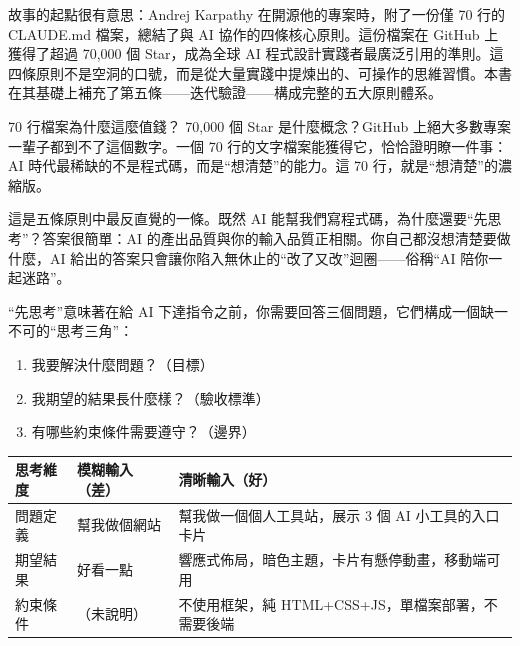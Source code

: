 

故事的起點很有意思：Andrej Karpathy 在開源他的專案時，附了一份僅 70 行的 CLAUDE.md 檔案，總結了與 AI 協作的四條核心原則。這份檔案在 GitHub 上獲得了超過 70,000 個 Star，成為全球 AI 程式設計實踐者最廣泛引用的準則。這四條原則不是空洞的口號，而是從大量實踐中提煉出的、可操作的思維習慣。本書在其基礎上補充了第五條——迭代驗證——構成完整的五大原則體系。

\begin{tcbinfo}{70 行檔案為什麼這麼值錢？}
70,000 個 Star 是什麼概念？GitHub 上絕大多數專案一輩子都到不了這個數字。一個 70 行的文字檔案能獲得它，恰恰證明瞭一件事：AI 時代最稀缺的不是程式碼，而是“想清楚”的能力。這 70 行，就是“想清楚”的濃縮版。

\end{tcbinfo}


這是五條原則中最反直覺的一條。既然 AI 能幫我們寫程式碼，為什麼還要“先思考”？答案很簡單：AI 的產出品質與你的輸入品質正相關。你自己都沒想清楚要做什麼，AI 給出的答案只會讓你陷入無休止的“改了又改”迴圈——俗稱“AI 陪你一起迷路”。

“先思考”意味著在給 AI 下達指令之前，你需要回答三個問題，它們構成一個缺一不可的“思考三角”：

\begin{enumerate}
  \item 我要解決什麼問題？（目標）
  \item 我期望的結果長什麼樣？（驗收標準）
  \item 有哪些約束條件需要遵守？（邊界）
\end{enumerate}

\begin{center}
\begin{tabularx}{\linewidth}{|X|X|X|}
\hline
\textbf{思考維度} & \textbf{模糊輸入（差）} & \textbf{清晰輸入（好）} \tabularnewline
\hline
問題定義 & 幫我做個網站 & 幫我做一個個人工具站，展示 3 個 AI 小工具的入口卡片 \tabularnewline
期望結果 & 好看一點 & 響應式佈局，暗色主題，卡片有懸停動畫，移動端可用 \tabularnewline
約束條件 & （未說明） & 不使用框架，純 HTML+CSS+JS，單檔案部署，不需要後端 \tabularnewline
\hline
\end{tabularx}
\end{center}

